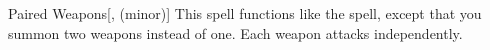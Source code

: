 \lowercase{\hypertarget{spell:Paired Weapons}{}}\label{spell:Paired Weapons}
\begin{freeability}[\nth{7}]{\hypertarget{spell:Paired Weapons}{Paired Weapons}}[,  (minor)]
This spell functions like the  spell, except that you summon two weapons instead of one.
Each weapon attacks independently.
\end{freeability}
\vspace{0.25em}

